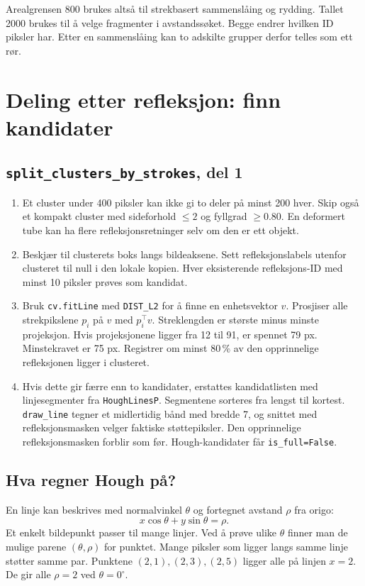 \documentclass[11pt,a4paper]{article}
\newcommand{\code}[1]{\texttt{#1}}
\begin{document}
Arealgrensen 800 brukes altså til strekbasert sammenslåing og rydding. Tallet 2000 brukes til å velge fragmenter i avstandssøket. Begge endrer hvilken ID piksler har. Etter en sammenslåing kan to adskilte grupper derfor telles som ett rør.

\newpage
\section{Deling etter refleksjon: finn kandidater}

\subsection*{\texttt{split\_clusters\_by\_strokes}, del 1}
\begin{enumerate}
\item Et cluster under 400 piksler kan ikke gi to deler på minst 200 hver. Skip også et kompakt cluster med sideforhold $\leq2$ og fyllgrad $\geq0.80$. En deformert tube kan ha flere refleksjonsretninger selv om den er ett objekt.
\item Beskjær til clusterets boks langs bildeaksene. Sett refleksjonslabels utenfor clusteret til null i den lokale kopien. Hver eksisterende refleksjons-ID med minst 10 piksler prøves som kandidat.
\item Bruk \code{cv.fitLine} med \code{DIST\_L2} for å finne en enhetsvektor $v$. Prosjiser alle strekpikslene $p_i$ på $v$ med $p_i^\top v$. Streklengden er største minus minste projeksjon. Hvis projeksjonene ligger fra 12 til 91, er spennet 79 px. Minstekravet er 75 px. Registrer om minst 80\,\% av den opprinnelige refleksjonen ligger i clusteret.
\item Hvis dette gir færre enn to kandidater, erstattes kandidatlisten med linjesegmenter fra \code{HoughLinesP}. Segmentene sorteres fra lengst til kortest. \code{draw\_line} tegner et midlertidig bånd med bredde 7, og snittet med refleksjonsmasken velger faktiske støttepiksler. Den opprinnelige refleksjonsmasken forblir som før. Hough-kandidater får \code{is\_full=False}.
\end{enumerate}

\subsection*{Hva regner Hough på?}
En linje kan beskrives med normalvinkel $\theta$ og fortegnet avstand $\rho$ fra origo:
\[
 x\cos\theta+y\sin\theta=\rho.
\]
Et enkelt bildepunkt passer til mange linjer. Ved å prøve ulike $\theta$ finner man de mulige parene $(\theta,\rho)$ for punktet. Mange piksler som ligger langs samme linje støtter samme par. Punktene $(2,1),(2,3),(2,5)$ ligger alle på linjen $x=2$. De gir alle $\rho=2$ ved $\theta=0^\circ$.
\end{document}
